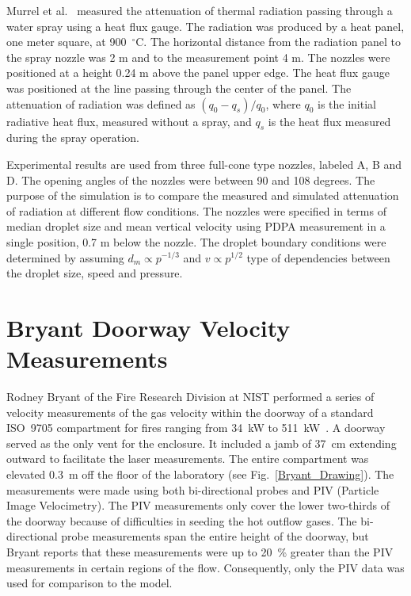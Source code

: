 Murrel et al.~\cite{Murrel:1995} measured the attenuation of thermal radiation passing through a water
spray using a heat flux gauge. The radiation was produced by a heat panel, one meter square, at 900~$^\circ$C. The horizontal distance
from the radiation panel to the spray nozzle was 2 m and to the measurement point 4 m. The nozzles were positioned at
a height 0.24 m above the panel upper edge. The heat flux gauge was positioned at the line passing through the center
of the panel. The attenuation of radiation was defined as $(q_0-q_s)/q_0$, where $q_0$ is the initial radiative heat flux,
measured without a spray, and $q_s$ is the heat flux measured during the spray operation.

Experimental results are used from three full-cone type nozzles, labeled A, B and D. The opening angles of the nozzles were between 90 and 108 degrees.
The purpose of the simulation is to compare the measured and simulated attenuation of radiation at different flow conditions. The nozzles were
specified in terms of median droplet size and mean vertical velocity using PDPA measurement in a single position, 0.7 m below the nozzle. The droplet
boundary conditions were determined by assuming $d_m \propto p^{-1/3}$ and $v \propto p^{1/2}$ type of dependencies between the droplet size, speed
and pressure.

\section{Bryant Doorway Velocity Measurements}
\label{Bryant_Doorway_Velocity_Description}

Rodney Bryant of the Fire Research Division at NIST performed a series of velocity measurements of the gas velocity within the doorway of a standard ISO~9705 compartment for fires ranging from 34~kW to 511~kW~\cite{Bryant:FSJ2009,Bryant:EF2009,Bryant:CS2010}. A doorway served as the only vent for the enclosure. It included a jamb of 37~cm extending outward to facilitate the laser measurements. The entire compartment was elevated 0.3~m off the floor of the laboratory (see Fig.~\ref{Bryant_Drawing}). The measurements were made using both bi-directional probes and PIV (Particle Image Velocimetry). The PIV measurements only cover the
lower two-thirds of the doorway because of difficulties in seeding the hot outflow gases. The bi-directional probe measurements span the entire height of the doorway, but Bryant reports that these measurements were up to 20~\% greater than the PIV measurements in certain regions of the flow. Consequently, only the PIV data was used for comparison to the model.

